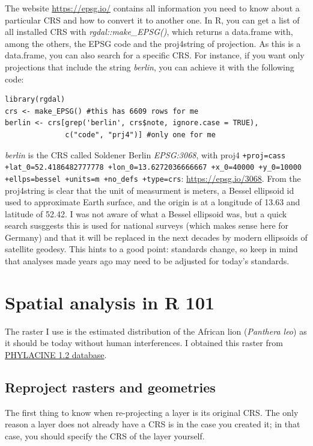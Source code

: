\documentclass{book}
\begin{document}
The website \href{https://epsg.io/}{https://epsg.io/} contains all information you need to know about a particular CRS and how to convert it to another one. 
In R, you can get a list of all installed CRS with \textit{rgdal::make\_EPSG()}, which returns a data.frame with, among the others, the EPSG code and the proj4string of projection. 
As this is a data.frame, you can also search for a specific CRS. For instance, if you want only projections that include the string \textit{berlin}, you can achieve it with the following code:

\begin{lstlisting}
library(rgdal)
crs <- make_EPSG() #this has 6609 rows for me
berlin <- crs[grep('berlin', crs$note, ignore.case = TRUE),
              c("code", "prj4")] #only one for me
\end{lstlisting}
\textit{berlin} is the CRS called Soldener Berlin \textit{EPSG:3068}, with proj4 \texttt{+proj=cass +lat\_0=52.4186482777778 +lon\_0=13.6272036666667 +x\_0=40000 +y\_0=10000 +ellps=bessel +units=m +no\_defs +type=crs}: \href{https://epsg.io/3068}{https://epsg.io/3068}. 
From the proj4string is clear that the unit of measurment is meters, a Bessel ellipsoid id used to approximate Earth surface, and the origin is at a longitude of 13.63 and latitude of 52.42. 
I was not aware of what a Bessel ellipsoid was, but a quick search susggests this is used for national surveys (which makes sense here for Germany) and that it will be replaced in the next decades by modern ellipsoids of satellite geodesy. 
This hints to a good point: standards change, so keep in mind that analyses made years ago may need to be adjusted for today's standards.

\section{Spatial analysis in R 101}
The raster I use is the estimated distribution of the African lion (\textit{Panthera leo}) as it should be today without human interferences.
I obtained this raster from \href{https://github.com/MegaPast2Future/PHYLACINE_1.2/blob/master/Data/Ranges/Present_natural/Panthera_leo.tif}{PHYLACINE 1.2 database}.

\subsection{Reproject rasters and geometries}
The first thing to know when re-projecting a layer is its original CRS. The only reason a layer does not already have a CRS is in the case you created it; in that case, you should specify the CRS of the layer yourself.
\end{document}
